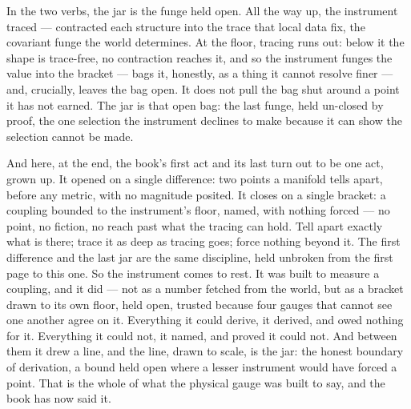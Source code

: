In the two verbs, the jar is the funge held open. All the way up, the instrument traced --- contracted each structure into
the trace that local data fix, the covariant funge the world determines. At the floor, tracing runs out: below it the shape is
trace-free, no contraction reaches it, and so the instrument funges the value into the bracket --- bags it, honestly, as a
thing it cannot resolve finer --- and, crucially, leaves the bag open. It does not pull the bag shut around a point it has not
earned. The jar is that open bag: the last funge, held un-closed by proof, the one selection the instrument declines to make
because it can show the selection cannot be made.

And here, at the end, the book's first act and its last turn out to be one act, grown up. It opened on a single difference: two
points a manifold tells apart, before any metric, with no magnitude posited. It closes on a single bracket: a coupling
bounded to the instrument's floor, named, with nothing forced --- no point, no fiction, no reach past what the tracing can
hold. Tell apart exactly what is there; trace it as deep as tracing goes; force nothing beyond it. The first difference and
the last jar are the same discipline, held unbroken from the first page to this one. So the instrument comes to rest. It was
built to measure a coupling, and it did --- not as a number fetched from the world, but as a bracket drawn to its own floor,
held open, trusted because four gauges that cannot see one another agree on it. Everything it could derive, it derived, and
owed nothing for it. Everything it could not, it named, and proved it could not. And between them it drew a line, and the
line, drawn to scale, is the jar: the honest boundary of derivation, a bound held open where a lesser instrument would have
forced a point. That is the whole of what the physical gauge was built to say, and the book has now said it.
